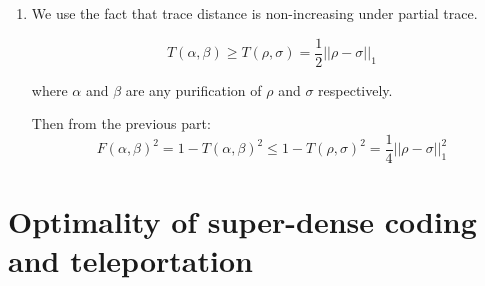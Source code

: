 \documentclass[12pt]{article}
\begin{document}
\begin{enumerate}
\item
We use the fact that trace distance is non-increasing under partial trace.

\begin{displaymath}
T(\alpha, \beta) \ge T(\rho, \sigma) = \frac{1}{2} ||\rho - \sigma||_1
\end{displaymath}

where $\alpha$ and $\beta$ are any purification of $\rho$ and $\sigma$
respectively.

Then from the previous part:
\begin{displaymath}
F(\alpha, \beta)^2 = 1 - T(\alpha, \beta)^2 \le 1 - T(\rho, \sigma)^2 =
\frac{1}{4} || \rho - \sigma ||^2_1
\end{displaymath}

\end{enumerate}

\pagebreak

\setcounter{section}{1}
\section{Optimality of super-dense coding and teleportation}
\end{document}
